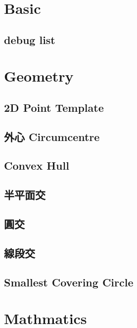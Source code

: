\section{Basic}

\subsection{debug list}


\section{Geometry}

\subsection{2D Point Template}

\subsection{外心 Circumcentre}

\subsection{Convex Hull}

\subsection{半平面交}

\subsection{圓交}

\subsection{線段交}

\subsection{Smallest Covering Circle}


\section{Mathmatics}

